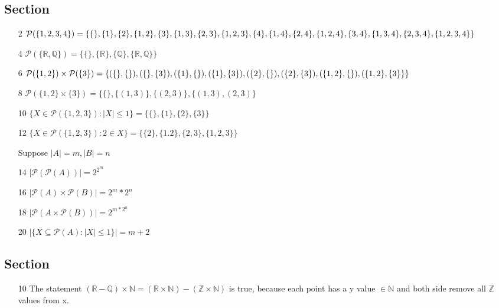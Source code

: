 \documentclass{article}
\begin{document}
\subsection{Section}
\begin{enumerate}
    \item[2] $ \mathcal{P}(\{1,2,3,4\}) = \{\{\},\{1\},\{2\},\{1, 2\},\{3\},\{1, 3\},\{2, 3\},\{1, 2, 3\},\{4\},\{1, 4\},\{2, 4\},\\\{1, 2, 4\},\{3, 4\},\{1, 3, 4\},\{2, 3, 4\},\{1, 2, 3, 4\}\}$
    \item[4] $ \mathcal{P}(\{ \mathbb{R}, \mathbb{Q} \}) = \{\{\}, \{\mathbb{R}\},\{\mathbb{Q}\},\{\mathbb{R}, \mathbb{Q}\}\}$
    \item[6] $ \mathcal{P}(\{ 1,2 \}) \times \mathcal{P}(\{ 3 \})= \{(\{\}, \{\}),(\{\}, \{3\}),(\{1\}, \{\}),(\{1\}, \{3\}),(\{2\}, \{\}),(\{2\}, \{3\}),\\(\{1, 2\}, \{\}),(\{1, 2\}, \{3\}\}\}$
    \item[8] $ \mathcal{P}(\{ 1,2 \} \times \{ 3 \})= \{\{\},\{(1, 3)\},\{(2, 3)\},\{(1, 3), (2, 3)\}$
    \item[10] $ \{ X \in \mathcal{P}( \{ 1,2,3 \} ): |X| \leq 1 \}=\{\{\}, \{1\}, \{2\},\{3\} \}$
    \item[12] $ \{ X \in \mathcal{P}( \{ 1,2,3 \} ): 2 \in X \}= \{\{2\},\{1.2\},\{2,3\},\{1,2,3\}\}$
    \item[] Suppose $|A|=m, |B|=n$
    \item[14] $ | \mathcal{P}(\mathcal{P}(A)) | = 2^{2^m} $
    \item[16] $ | \mathcal{P}(A) \times \mathcal{P}(B) | = 2^m * 2^n$
    \item[18] $ | \mathcal{P}( A \times \mathcal{P}(B) ) | = 2^{m * 2^n} $
    \item[20] $ | \{ X \subseteq \mathcal{P}(A): |X| \leq 1 \} | = m + 2 $
\end{enumerate}

\subsection{Section}
\begin{enumerate}
    \item[10] The statement $ (\mathbb{R} - \mathbb{Q}) \times \mathbb{N} = (\mathbb{R} \times \mathbb{N}) - (\mathbb{Z} \times \mathbb{N})$ is true, because each point has a y value $\in \mathbb{N}$ and both side remove all $\mathbb{Z}$ values from x.
\end{enumerate}
\end{document}

